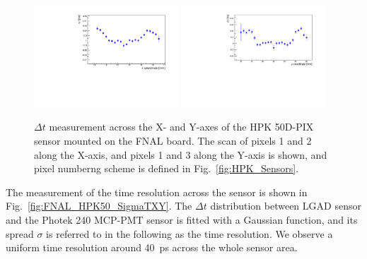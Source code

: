 \documentclass[preprint,1p]{elsarticle}
\begin{document}
\begin{figure}[htbp] 
\centering
\includegraphics[width=0.48\textwidth]{figs/FNALBoard_HPK50DPix_Run847-891/MeanTime_vs_X_Ch4_5.pdf} 
\includegraphics[width=0.48\textwidth]{figs/FNALBoard_HPK50DPix_Run847-891/MeanTime_vs_Y_Ch3_4.pdf} 
\caption{$\Delta t$ measurement across the X- and Y-axes of the HPK 50D-PIX sensor mounted on the FNAL board. The scan of pixels 1 and 2 along the X-axis, and pixels 1 and 3 along the Y-axis is shown, and pixel numberng scheme is defined in Fig.~\ref{fig:HPK_Sensors}.} 
\label{fig:FNAL_HPK50_DTXY} 
\end{figure} 

The measurement of the time resolution across the sensor is shown in
Fig.~\ref{fig:FNAL_HPK50_SigmaTXY}. The $\Delta t$ distribution between LGAD
sensor and the Photek 240 MCP-PMT sensor is fitted with a Gaussian function, and its
spread $\sigma$ is referred to in the following as the time resolution. We
observe a uniform time resolution around 40~ps across the whole sensor area. 
\end{document}
